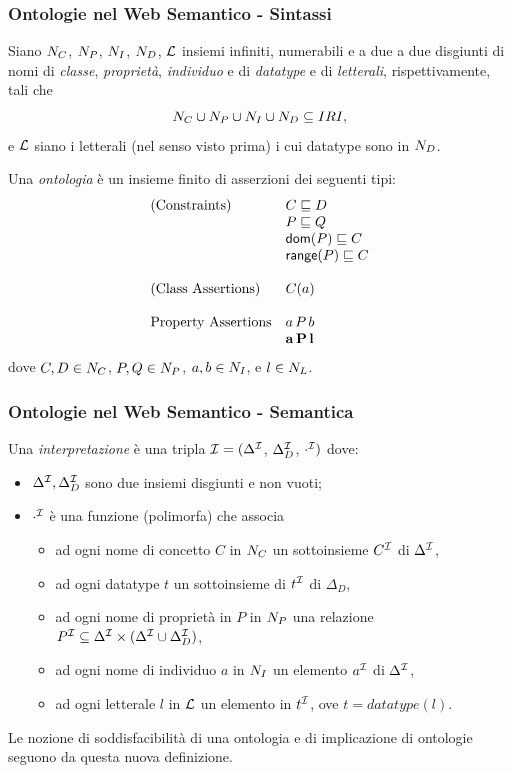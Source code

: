\documentclass[8pt]{beamer}
\begin{document}
\begin{frame}
 \frametitle{Ontologie nel Web Semantico - Sintassi}

Siano $N_C$, $N_P$, $N_I$, $N_D$, $\mathcal{L}$ insiemi
infiniti, numerabili e a due a due disgiunti di nomi di \emph{classe}, \emph{propriet\`a},
\emph{individuo} e di  \emph{datatype} e di \emph{letterali}, rispettivamente,
tali che
\[
	N_C \cup N_P \cup N_I \cup N_D \subseteq IRI , 
\]
e $\mathcal{L}$ siano i letterali (nel senso visto prima) i cui datatype
sono in $N_D$.

Una \emph{ontologia} \`e un insieme finito di asserzioni dei seguenti tipi:
\[
 \begin{array}{ll}
  \mbox{(Constraints)} & C \sqsubseteq D\\
  & P \sqsubseteq Q \\
  & \mathsf{dom}(P) \sqsubseteq C \\
  & \mathsf{range}(P) \sqsubseteq C \\
  &\\
  \mbox{(Class Assertions)} & C(a)\\
  &\\
  \mbox{Property Assertions} & a\,P\,b\\
  & \mathbf{a\,P\,l}\\
 \end{array}
\]
dove $C, D \in N_C$, $P, Q \in N_P$, $a, b \in N_I$,
e $l \in N_L$.
\end{frame}

\begin{frame}
 \frametitle{Ontologie nel Web Semantico - Semantica}
Una \emph{interpretazione} \`e una
tripla $\mathcal{I}=(\Delta^{\mathcal{I}}$, $\Delta_{D}^{\mathcal{I}}$, $\cdot^{\mathcal{I}})$ dove:
\begin{itemize}
 \item $\Delta^{\mathcal{I}}, \Delta_{D}^{\mathcal{I}}$ sono due insiemi disgiunti e non vuoti;
 \item $\cdot^{\mathcal{I}}$ \`e una funzione (polimorfa) che associa
 \begin{itemize}
  \item ad ogni nome di concetto $C$ in $N_C$ un sottoinsieme $C^{\mathcal{I}}$ di
  $\Delta^{\mathcal{I}}$,
  \item ad ogni datatype $t$ un sottoinsieme di $t^{\mathcal{I}}$ di $\Delta_{D}$, 
  \item ad ogni nome di propriet\`a in $P$ in $N_P$ una relazione 
  $P^{\mathcal{I}} \subseteq \Delta^{\mathcal{I}} \times (\Delta^{\mathcal{I}} \cup \Delta_D^{\mathcal{I}})$,
  \item ad ogni nome di individuo $a$ in $N_I$ un elemento $a^{\mathcal{I}}$ di
  $\Delta^{\mathcal{I}}$,
  \item ad ogni letterale $l$ in $\mathcal{L}$ un elemento in $t^{\mathcal{I}}$, ove
  $t=datatype(l)$.
 \end{itemize}
\end{itemize}

Le nozione di soddisfacibilit\`a di una ontologia e di implicazione di 
ontologie seguono da questa nuova definizione.
\end{frame}
\end{document}
